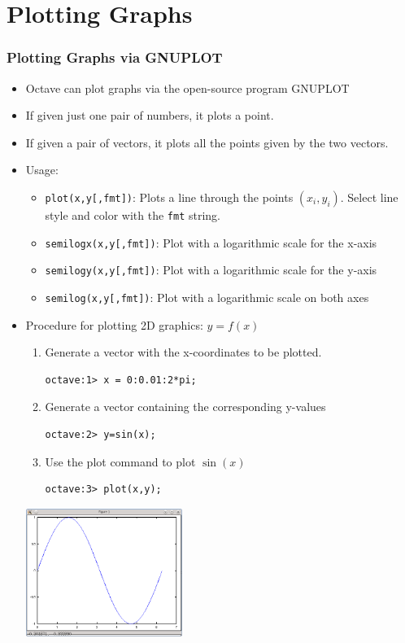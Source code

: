 \documentclass[slidestop,mathserif,compress,xcolor=svgnames]{beamer}
\begin{document}
\section{Plotting Graphs}
\begin{frame}
  \frametitle{\small Plotting Graphs via GNUPLOT}
  \begin{itemize}
    \item Octave can plot graphs via the open-source program GNUPLOT
    \item If given just one pair of numbers, it plots a point.
    \item If given a pair of vectors, it plots all the points given by the two vectors.
    \item Usage:
    \begin{itemize}
      \item \texttt{plot(x,y[,fmt])}: Plots a line through the points $(x_i,y_i)$. Select line style and color with the \texttt{fmt} string.
      \item \texttt{semilogx(x,y[,fmt])}: Plot with a logarithmic scale for the x-axis
      \item \texttt{semilogy(x,y[,fmt])}: Plot with a logarithmic scale for the y-axis
      \item \texttt{semilog(x,y[,fmt])}: Plot with a logarithmic scale on both axes
    \end{itemize}
    \framebreak
    \item Procedure for plotting 2D graphics: $y=f(x)$
    \begin{enumerate}
      \item Generate a vector with the x-coordinates to be plotted.
      \begin{verbatim}
octave:1> x = 0:0.01:2*pi;
      \end{verbatim}
      \item Generate a vector containing the corresponding y-values
      \begin{verbatim}
octave:2> y=sin(x);
      \end{verbatim}
      \item Use the plot command to plot $\sin(x)$
      \begin{verbatim}
octave:3> plot(x,y);
      \end{verbatim}
    \end{enumerate}
    \begin{center}
      \includegraphics[width=0.4\textwidth]{./octave-plot-sinx}

\end{center}
\end{itemize}
\end{frame}
\end{document}
